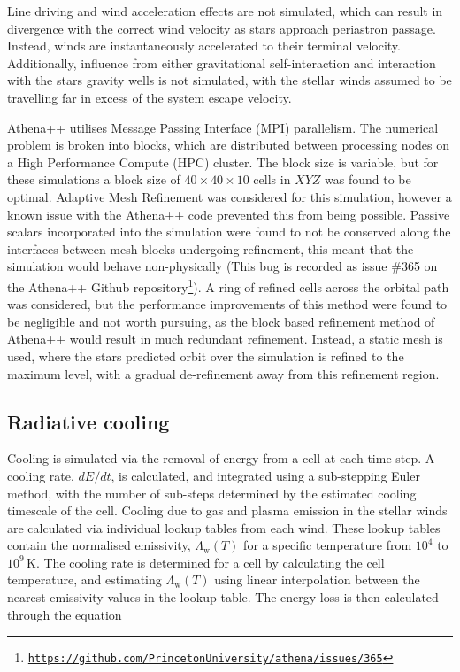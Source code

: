 \documentclass[fleqn,usenatbib]{mnras}
\newcommand{\rms}[1]{\ensuremath{_{\text{#1}}}}
\begin{document}
Line driving and wind acceleration effects are not simulated, which can result in divergence with the correct wind velocity as stars approach periastron passage.
Instead, winds are instantaneously accelerated to their terminal velocity.
Additionally, influence from either gravitational self-interaction and interaction with the stars gravity wells is not simulated, with the stellar winds assumed to be travelling far in excess of the system escape velocity.

Athena++ utilises Message Passing Interface (MPI) parallelism.
The numerical problem is broken into blocks, which are distributed between processing nodes on a High Performance Compute (HPC) cluster.
The block size is variable, but for these simulations a block size of $40\times 40 \times 10$ cells in $XYZ$ was found to be optimal.
Adaptive Mesh Refinement was considered for this simulation, however a known issue with the Athena++ code prevented this from being possible.
Passive scalars incorporated into the simulation were found to not be conserved along the interfaces between mesh blocks undergoing refinement, this meant that the simulation would behave non-physically (This bug is recorded as issue \#365 on the Athena++ Github repository\footnote{\texttt{\href{https://github.com/PrincetonUniversity/athena/issues/365.}{https://github.com/PrincetonUniversity/athena/issues/365}}}).
A ring of refined cells across the orbital path was considered, but the performance improvements of this method were found to be negligible and not worth pursuing, as the block based refinement method of Athena++ would result in much redundant refinement.
Instead, a static mesh is used, where the stars predicted orbit over the simulation is refined to the maximum level, with a gradual de-refinement away from this refinement region.

\subsection{Radiative cooling}

Cooling is simulated via the removal of energy from a cell at each time-step.
A cooling rate, $dE/dt$, is calculated, and integrated using a sub-stepping Euler method, with the number of sub-steps determined by the estimated cooling timescale of the cell.
Cooling due to gas and plasma emission in the stellar winds are calculated via individual lookup tables from each wind.
These lookup tables contain the normalised emissivity, $\Lambda\rms{w}(T)$ for a specific temperature from $10^4$ to $10^9 \, \si{\kelvin}$.
The cooling rate is determined for a cell by calculating the cell temperature, and estimating $\Lambda\rms{w}(T)$ using linear interpolation between the nearest emissivity values in the lookup table.
The energy loss is then calculated through the equation
\end{document}
